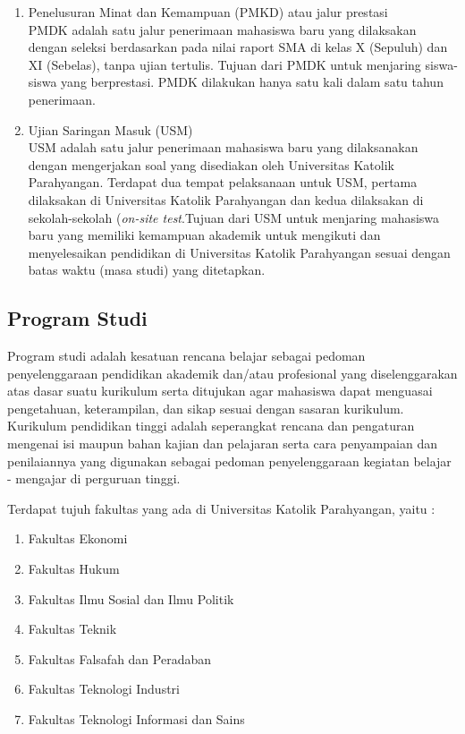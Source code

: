 \begin{enumerate}
	\item Penelusuran Minat dan Kemampuan (PMKD) atau jalur prestasi\\
		PMDK adalah satu jalur penerimaan mahasiswa baru yang dilaksakan dengan seleksi berdasarkan pada nilai raport SMA di kelas X (Sepuluh) dan XI (Sebelas), tanpa ujian tertulis. Tujuan dari PMDK untuk menjaring siswa-siswa yang berprestasi. PMDK dilakukan hanya satu kali dalam satu tahun penerimaan.
		
	\item Ujian Saringan Masuk (USM)\\
		USM adalah satu jalur penerimaan mahasiswa baru yang dilaksanakan dengan mengerjakan soal yang disediakan oleh Universitas Katolik Parahyangan. Terdapat dua tempat pelaksanaan untuk USM, pertama dilaksakan di Universitas Katolik Parahyangan dan kedua dilaksakan di sekolah-sekolah (\textit{on-site test}.Tujuan dari USM untuk menjaring mahasiswa baru yang memiliki kemampuan akademik untuk mengikuti dan menyelesaikan pendidikan di Universitas Katolik Parahyangan sesuai dengan batas waktu (masa studi) yang ditetapkan.
	
\end{enumerate}

\subsection{Program Studi}
\label{sec:program studi} 
Program studi adalah kesatuan rencana belajar sebagai pedoman penyelenggaraan pendidikan akademik dan/atau profesional yang diselenggarakan atas dasar suatu kurikulum serta ditujukan agar mahasiswa dapat menguasai pengetahuan, keterampilan, dan sikap sesuai dengan sasaran kurikulum. Kurikulum pendidikan tinggi adalah seperangkat rencana dan pengaturan mengenai isi maupun bahan kajian dan pelajaran serta cara penyampaian dan penilaiannya yang digunakan sebagai pedoman penyelenggaraan kegiatan belajar - mengajar di perguruan tinggi.  %

Terdapat tujuh fakultas yang ada di Universitas Katolik Parahyangan, yaitu :
	\begin{enumerate}
		\item Fakultas Ekonomi 
		\item Fakultas Hukum
		\item Fakultas Ilmu Sosial dan Ilmu Politik
		\item Fakultas Teknik
		\item Fakultas Falsafah dan Peradaban
		\item Fakultas Teknologi Industri
		\item Fakultas Teknologi Informasi dan Sains
	\end{enumerate}\leavevmode
	
